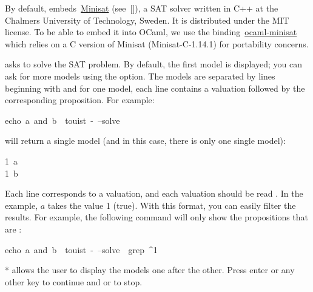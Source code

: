 \noindent By default,  embeds~\href{http://minisat.se}{Minisat}
(see~[]), a SAT solver written in C++ at the
Chalmers University of Technology, Sweden. It is distributed under the
MIT license. To be able to embed it into OCaml, we use the
binding~\href{https://github.com/c-cube/ocaml-minisat}{ocaml-minisat} which relies on a C version of Minisat
(Minisat-C-1.14.1) for portability concerns.%

\textbf{} asks  to solve the SAT problem. By default, the first
model is displayed; you can ask for more models using the 
option. The models are separated by lines beginning with \mdcode{====} and for
one model, each line contains a valuation followed by the corresponding
proposition. For example:%
\begin{mdpre}%
\noindent{}echo~a~and~b~\textbar{}~touist~-~--solve%
\end{mdpre}\noindent will return a single model (and in this case, there is only one single model):
\begin{mdpre}%
\noindent{}1~a\\
1~b%
\end{mdpre}\noindent Each line corresponds to a valuation, and each valuation should be read
. In the example, $a$ takes the value 1 (true).
With this format, you can easily filter the results. For example,
the following command will only show the propositions that are :
\begin{mdpre}%
\noindent{}echo~a~and~b~\textbar{}~touist~-~--solve~\textbar{}~grep~\textasciicircum{}1%
\end{mdpre}\noindent** allows the user to display the models one after
the other. Press enter or any other key to continue and  or  to stop.

